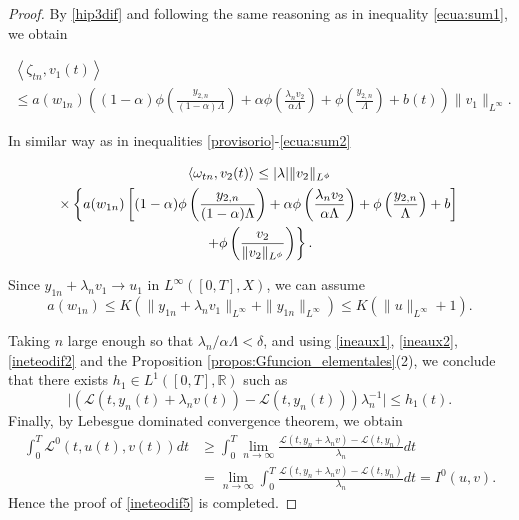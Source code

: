 \documentclass[twoside]{article}
\theoremstyle{definition}
\theoremstyle{plain}
\theoremstyle{remark}
\begin{document}
\begin{proof}
By \ref{hip3dif} and following the same reasoning as  in inequality \eqref{ecua:sum1}, we obtain


\begin{multline}\label{ineteodif1}
\left< \zeta_{tn}, v_1(t)\right>  \\
\leq a(w_{1n})\left((1-\alpha)\phi\left( \frac{y_{2,n}}{(1-\alpha)\Lambda}\right)+\alpha\phi\left( \frac{\lambda_n v_2}{\alpha\Lambda} \right)+\phi\left(\frac{y_{2,n}}{\Lambda}\right)+b(t)\right)\|v_1\|_{L^\infty}.
\end{multline}

In similar way as in inequalities \eqref{provisorio}-\eqref{ecua:sum2}

\begin{multline}\label{ineteodif2}\small
\left< \omega_{tn},v_2(t)\right>
 \leq |\lambda| \|v_2\|_{L^\phi}\\
 \times \left\{ a(w_{1n}) \left [(1-\alpha)\phi\left( \frac{y_{2,n}}{(1-\alpha)\Lambda}\right)+\alpha\phi\left( \frac{\lambda_n v_2}{\alpha\Lambda}\right)+\phi\left( \frac{y_{2,n}}{\Lambda} \right) + b\right]\right. \\
 \left.+ \phi\left( \frac{v_2}{\|v_2\|_{L^\phi}}\right) \right\}.
 \end{multline}


Since $y_{1n}+\lambda_n v_1 \to u_1$ in $L^\infty([0,T],X)$, we can assume
  \[a(w_{1n})\leq K(\|y_{1n}+\lambda_n v_1\|_{L^\infty}+\|y_{1n}\|_{L^\infty})\leq K(\|u\|_{L^\infty}+1).\]
  
Taking $n$ large enough so that ${\lambda_n}/{\alpha \Lambda}<\delta$, and using \eqref{ineaux1}, \eqref{ineaux2},\eqref{ineteodif2} and the Proposition \ref{propos:Gfuncion_elementales}(2),  we conclude that there exists $h_1 \in L^1([0,T],\mathbb{R})$ such as
$$\big|\left(\mathcal{L}(t,y_n(t)+\lambda_n v(t))-\mathcal{L}(t,y_n(t))\right)\lambda_n^{-1}\big|\leq h_1(t).$$
Finally, by Lebesgue dominated convergence theorem, we obtain
\begin{equation*}
\begin{split}
 \int_0^T{\mathcal{L}^0 (t,u(t),v(t)) dt}&\geq\int_0^T {\lim\limits_{n\rightarrow \infty}\frac{ \mathcal{L}(t,y_n+ \lambda_n v)- \mathcal{L}(t,y_n)}{\lambda_n} dt}\\
 &=\lim\limits_{n\rightarrow \infty} \int_0^T \frac{ \mathcal{L}(t,y_n+ \lambda_n v)- \mathcal{L}(t,y_n)}{\lambda_n} dt = I^0 (u,v).
\end{split}
\end{equation*}
Hence the proof of \eqref{ineteodif5} is completed.



\end{proof}
\end{document}
